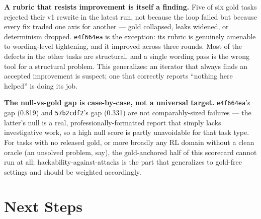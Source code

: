 \documentclass[11pt,a4paper]{article}
\begin{document}
\textbf{A rubric that resists improvement is itself a finding.} Five of six gold tasks rejected their v1 rewrite in the latest run, not because the loop failed but because every fix traded one axis for another --- gold collapsed, leaks widened, or determinism dropped. \texttt{e4f664ea} is the exception: its rubric is genuinely amenable to wording-level tightening, and it improved across three rounds. Most of the defects in the other tasks are structural, and a single wording pass is the wrong tool for a structural problem. This generalizes: an iterator that always finds an accepted improvement is suspect; one that correctly reports ``nothing here helped'' is doing its job.

\textbf{The null-vs-gold gap is case-by-case, not a universal target.} \texttt{e4f664ea}'s gap (0.819) and \texttt{57b2cdf2}'s gap (0.331) are not comparably-sized failures --- the latter's null is a real, professionally-formatted report that simply lacks investigative work, so a high null score is partly unavoidable for that task type. For tasks with no released gold, or more broadly any RL domain without a clean oracle (an unsolved problem, say), the gold-anchored half of this scorecard cannot run at all; hackability-against-attacks is the part that generalizes to gold-free settings and should be weighted accordingly.

\section{Next Steps}
\end{document}
